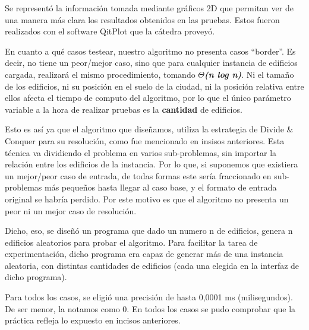 \documentclass[10pt,a4paper]{article}
\begin{document}
Se representó la información tomada mediante gráficos 2D que permitan ver de una manera más clara los resultados obtenidos en las pruebas. Estos fueron realizados con el software QitPlot que la cátedra proveyó.

En cuanto a qué casos testear, nuestro algoritmo no presenta casos “border”. Es decir, no tiene un peor/mejor caso, sino que para cualquier instancia de edificios cargada, realizará el mismo procedimiento, tomando \textbf{$\Theta$\textit{(n log n)}}. Ni el tamaño de los edificios, ni su posición en el suelo de la ciudad, ni la posición relativa entre ellos afecta el tiempo de computo del algoritmo, por lo que el único parámetro variable a la hora de realizar pruebas es la \textbf{cantidad} de edificios.

Esto es así ya que el algoritmo que diseñamos, utiliza la estrategia de Divide \& Conquer para su resolución, como fue mencionado en insisos anteriores. Esta técnica va dividiendo el problema en varios sub-problemas, sin importar la relación entre los edificios de la instancia. Por lo que, si suponemos que existiera un mejor/peor caso de entrada, de todas formas este sería fraccionado en sub-problemas más pequeños hasta llegar al caso base, y el formato de entrada original se habría perdido. Por este motivo es que el algoritmo no presenta un peor ni un mejor caso de resolución.

Dicho, eso, se diseñó un programa que dado un numero n de edificios, genera n edificios aleatorios para probar el algoritmo. Para facilitar la tarea de experimentación, dicho programa era capaz de generar más de una instancia aleatoria, con distintas cantidades de edificios (cada una elegida en la interfaz de dicho programa).

Para todos los casos, se eligió una precisión de hasta 0,0001 ms (milisegundos). De ser menor, la notamos como 0.
En todos los casos se pudo comprobar que la práctica refleja lo expuesto en incisos anteriores.
\end{document}
